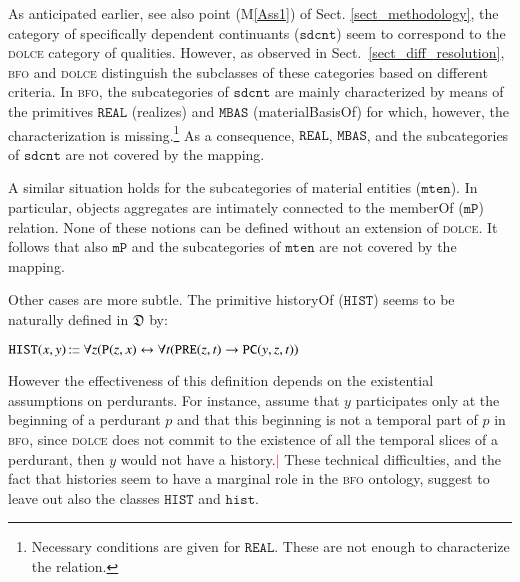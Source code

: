 \documentclass[ao]{iosart2x}
\newcommand{\nb}[1]{\textcolor{red}{$|$}\marginpar{\hspace*{-0cm}\parbox{20mm}{\scriptsize\raggedright\textcolor{red}{#1}}}}
\newcommand{\bflist}{\begin{list}{}{\setlength{\topsep}{2mm}\setlength{\parsep}{0mm}\setlength{\leftmargin}{9.2mm}\setlength{\labelwidth}{8mm}}}
\newcommand{\eflist}{\end{list}}
\newcommand{\pr}[1]{\mathtt{#1}}
\newcommand{\cn}[1]{\mathtt{#1}}
\newcommand{\ifif}{\leftrightarrow}
\newcommand\textequal{%
 \rule[.08ex]{5pt}{0.35pt}\llap{\rule[.78ex]{5pt}{0.35pt}}}
\newcommand{\sdef}{{\hspace{1.5pt}:\hspace{-2.5pt}\textequal\hspace{3pt}}}
\newcommand{\dolce}{{\textsc{dolce}}}
\newcommand{\bfo}{{\textsc{bfo}}}
\newcommand {\thdolce} {\ensuremath{\mathfrak{D}}}
\newcommand {\Pd} {\ensuremath{\pr{P}}}
\newcommand {\PREd} {\ensuremath{\pr{PRE}}}
\newcommand {\PCd} {\ensuremath{\pr{PC}}}
\newcommand{\sdcntbcat}{\cn{sdcnt}}
\newcommand{\mtenbcat}{\cn{mten}}
\newcommand{\histbcat}{\cn{hist}}
\newcommand{\bfompart}{\pr{mP}}
\newcommand{\bforealizes}{\pr{REAL}}
\newcommand{\bfohistory}{\pr{HIST}}
\begin{document}
As anticipated earlier, see also point (M\ref{Ass1}) of Sect. \ref{sect_methodology}, the category of specifically dependent continuants ($\sdcntbcat$) seem to correspond to the {\dolce} category of qualities. However, as observed in Sect.~\ref{sect_diff_resolution}, {\bfo} and {\dolce} distinguish the subclasses of these categories based on different criteria. In {\bfo}, the subcategories of $\sdcntbcat$ are mainly characterized by means of the primitives $\bforealizes$ (realizes) and $\pr{MBAS}$ (materialBasisOf) for which, however, the characterization is missing.\footnote{Necessary conditions are given for $\bforealizes$. These are not enough to characterize the relation.} As a consequence, $\bforealizes$, $\pr{MBAS}$, and the subcategories of $\sdcntbcat$ are not covered by the mapping.

A similar situation holds for the subcategories of material entities ($\mtenbcat$). In particular, objects aggregates are intimately connected to the memberOf ($\bfompart$) relation. None of these notions can be defined without an extension of {\dolce}. It follows that also $\bfompart$ and the subcategories of $\mtenbcat$ are not covered by the mapping.

Other cases are more subtle. The primitive historyOf ($\bfohistory$) seems to be naturally defined in $\thdolce$ by:
%
\bflist
\item[] $\bfohistory(x,y) \sdef \forall z(\Pd(z,x) \ifif \forall t(\PREd(z,t) \to \PCd(y,z,t))$
\eflist
%
However the effectiveness of this definition depends on the existential assumptions on perdurants. 
For instance, assume that $y$ participates only at the beginning of a perdurant $p$ and that this beginning is not a temporal part of $p$ in {\bfo}, since {\dolce} does not commit to the existence of all the temporal slices of a perdurant, then $y$ would not have a history.\nb{SB: questo non era semplice da spiegare, ho cambiato molto}
These technical difficulties, and the fact that histories seem to have a marginal role in the {\bfo} ontology, suggest to leave out also the classes $\bfohistory$ and $\histbcat$.
\end{document}
